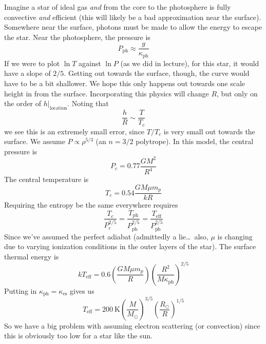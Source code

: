 \documentclass[10pt]{article}
\numberwithin{equation}{section}
\begin{document}
  Imagine a star of ideal gas \emph{and} from the core to the
  photosphere is fully convective \emph{and} efficient (this will
  likely be a bad approximation near the surface). Somewhere near the
  surface, photons must be made to allow the energy to escape the
  star. Near the photosphere, the pressure is
  \begin{equation}
    \label{eq:52}
    P_{\mathrm{ph}}\approx \frac{g}{\kappa_{\mathrm{ph}}}
  \end{equation}
  If we were to plot $\ln T$ against $\ln P$ (as we did in lecture),
  for this star, it would have a slope of $2/5$. Getting out towards
  the surface, though, the curve would have to be a bit shallower. We
  hope this only happens out towards one scale height in from the
  surface. Incorporating this physics will change $R$, but only on the
  order of $\left.h\right|_{\mathrm{location}}$. Noting that
  \begin{equation}
    \label{eq:53}
    \frac{h}{R}\sim \frac{T}{T_c}
  \end{equation}
  we see this is an extremely small error, since $T/T_c$ is very small
  out towards the surface. We assume $P\propto \rho^{5/3}$ (an $n=3/2$
  polytrope). In this model, the central pressure is
  \begin{equation}
    \label{eq:54}
    P_c=0.77\frac{GM^2}{R^4}
  \end{equation}
  The central temperature is
  \begin{equation}
    \label{eq:55}
    T_c=0.54\frac{GM\mu m_p}{kR}
  \end{equation}
  Requiring the entropy be the same everywhere requires
  \begin{equation}
    \label{eq:56}
    \frac{T_c}{P_c^{2/5}}=\frac{T_{\mathrm{ph}}}{P_{\mathrm{ph}}^{2/5}}=
\frac{T_{\mathrm{eff}}}{P_{\mathrm{ph}}^{2/5}}
  \end{equation}
  Since we've assumed the perfect adiabat (admittedly a lie\ldots\
  also, $\mu$ is changing due to varying ionization conditions in the
  outer layers of the star). The surface thermal energy is
  \begin{equation}
    \label{eq:57}
    kT_{\mathrm{eff}}=0.6\left(\frac{GM\mu m_p}{R}\right)\left(\frac{R^2}{M
\kappa_{\mathrm{ph}}}\right)^{2/5}
  \end{equation}
  Putting in $\kappa_{\mathrm{ph}}=\kappa_{\mathrm{es}}$ gives us 
  \begin{equation}
    \label{eq:58}
    T_{\mathrm{eff}}=200\ \mathrm{K}\left(\frac{M}{M_\odot}\right)^
{3/5}\left(\frac{R_\odot}{R}\right)^{1/5}
  \end{equation}
  So we have a big problem with assuming electron scattering (or
  convection) since this is obviously too low for a star like the
  sun.\\
\end{document}
